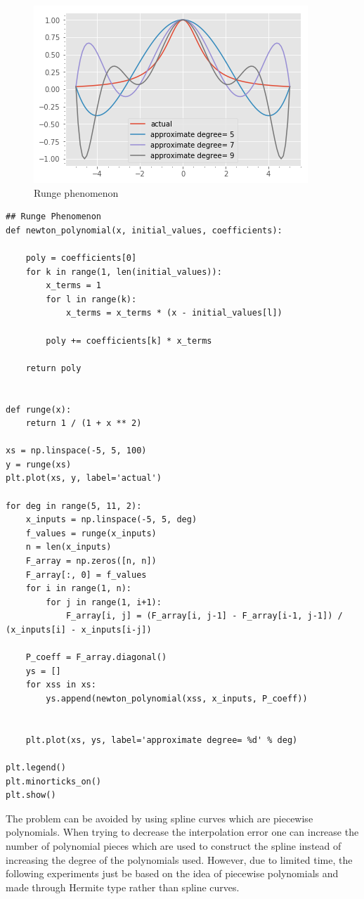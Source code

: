 \documentclass[preprint,12pt]{elsarticle}
\begin{document}
\begin{figure}[h]
\centering\includegraphics[width=0.4\linewidth]{Runge_phenomenon.png}
\caption{Runge phenomenon}
\label{fig:pw1}
\end{figure}

\begin{lstlisting}
## Runge Phenomenon
def newton_polynomial(x, initial_values, coefficients):
    
    poly = coefficients[0]
    for k in range(1, len(initial_values)):
        x_terms = 1
        for l in range(k):
            x_terms = x_terms * (x - initial_values[l])
        
        poly += coefficients[k] * x_terms
    
    return poly


def runge(x):
    return 1 / (1 + x ** 2)

xs = np.linspace(-5, 5, 100)
y = runge(xs)
plt.plot(xs, y, label='actual')

for deg in range(5, 11, 2):
    x_inputs = np.linspace(-5, 5, deg)
    f_values = runge(x_inputs)
    n = len(x_inputs)
    F_array = np.zeros([n, n])
    F_array[:, 0] = f_values
    for i in range(1, n):
        for j in range(1, i+1):
            F_array[i, j] = (F_array[i, j-1] - F_array[i-1, j-1]) / (x_inputs[i] - x_inputs[i-j])

    P_coeff = F_array.diagonal()
    ys = []
    for xss in xs:
        ys.append(newton_polynomial(xss, x_inputs, P_coeff))


    plt.plot(xs, ys, label='approximate degree= %d' % deg)

plt.legend()
plt.minorticks_on()
plt.show()
\end{lstlisting}

The problem can be avoided by using spline curves which are piecewise polynomials. When trying to decrease the interpolation error one can increase the number of polynomial pieces which are used to construct the spline instead of increasing the degree of the polynomials used. However, due to limited time, the following experiments just be based on the idea of piecewise polynomials and made through Hermite type rather than spline curves.
\end{document}
